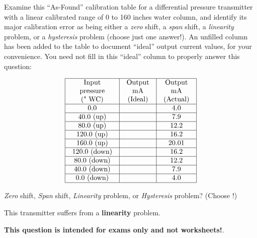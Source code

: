 

Examine this ``As-Found'' calibration table for a differential pressure transmitter with a linear calibrated range of 0 to 160 inches water column, and identify its major calibration error as being either a {\it zero} shift, a {\it span} shift, a {\it linearity} problem, or a {\it hysteresis} problem (choose just one answer!).  An unfilled column has been added to the table to document ``ideal'' output current values, for your convenience.  You need not fill in this ``ideal'' column to properly answer this question:


$$\vbox{\offinterlineskip
\halign{\strut
\vrule \quad\hfil # \ \hfil & 
\vrule \quad\hfil # \ \hfil & 
\vrule \quad\hfil # \ \hfil \vrule \cr
\noalign{\hrule}
%
Input & Output & Output \cr
%
pressure & mA & mA \cr
%
(" WC) & (Ideal) & (Actual) \cr
%
\noalign{\hrule}
%
0.0 & & 4.0 \cr
%
\noalign{\hrule}
%
40.0 (up) & & 7.9 \cr
%
\noalign{\hrule}
%
80.0 (up) & & 12.2 \cr
%
\noalign{\hrule}
%
120.0 (up) & & 16.2 \cr
%
\noalign{\hrule}
%
160.0 (up) & & 20.01 \cr
%
\noalign{\hrule}
%
120.0 (down) & & 16.2 \cr
%
\noalign{\hrule}
%
80.0 (down) & & 12.2 \cr
%
\noalign{\hrule}
%
40.0 (down) & & 7.9 \cr
%
\noalign{\hrule}
%
0.0 (down) & & 4.0 \cr
%
\noalign{\hrule}
} %
}$$ %

{\it Zero} shift, {\it Span} shift, {\it Linearity} problem, or {\it Hysteresis} problem?  (Choose !)







This transmitter suffers from a {\bf linearity} problem.







{\bf This question is intended for exams only and not worksheets!}.


